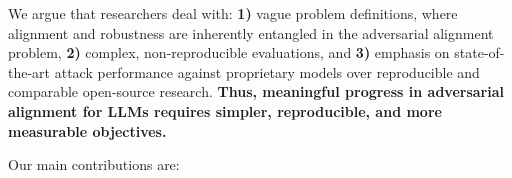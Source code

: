 \begin{tcolorbox}[
    colback=white, colframe=customblue, coltitle=white, fonttitle=\bfseries, 
    rounded corners, enhanced, 
    title=Position, 
    attach boxed title to top left={yshift=-2mm, xshift=5mm}, 
    boxed title style={colback=customblue, rounded corners},
    boxsep=1mm,
    left=1mm, %
    right=1mm
]
 We argue that researchers deal with:\,\,\textbf{1)} vague problem definitions, where alignment and robustness are inherently entangled in the adversarial alignment problem, \textbf{2)} complex, non-reproducible evaluations, and \textbf{3)} emphasis on state-of-the-art attack performance against proprietary models over reproducible and comparable open-source research. \textbf{Thus, meaningful progress in adversarial alignment for LLMs requires simpler, reproducible, and more measurable objectives.}
\end{tcolorbox}

Our main contributions are:



